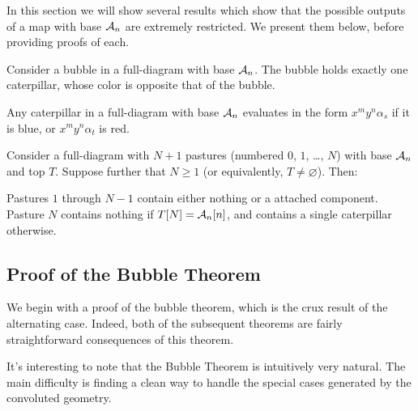 In this section we will show several results which show that the possible outputs of a map with base $\AA_n$ are extremely restricted.  We present them below, before providing proofs of each.
\begin{theorem}
	Consider a bubble in a full-diagram with base $\AA_n$.  The bubble holds exactly one caterpillar, whose color is opposite that of the bubble.
	\label{thm:bubble}
\end{theorem}
\begin{theorem}
	Any caterpillar in a full-diagram with base $\AA_n$ evaluates in the form $x^my^n\alpha_s$ if it is blue, or $x^my^n\alpha_t$ is red.
	\label{thm:caterpillar}
\end{theorem}
\begin{theorem}
	Consider a full-diagram with $N+1$ pastures (numbered $0$, $1$, \dots, $N$) with base $\AA_n$ and top $T$.  Suppose further that $N \ge 1$ (or equivalently, $T \neq \varnothing$).  Then:
	\begin{enumerate}[(i)]
		\ii Pastures $1$ through $N-1$ contain either nothing or a attached component.
		\ii Pasture $N$ contains nothing if $T[N] = \AA_n[n]$, and contains a single caterpillar otherwise.
	\end{enumerate}
	\label{thm:pasture}
\end{theorem}

\subsection{Proof of the Bubble Theorem}
We begin with a proof of the bubble theorem, which is the crux result of the alternating case.  Indeed, both of the subsequent theorems are fairly straightforward consequences of this theorem.

It's interesting to note that the Bubble Theorem is intuitively very natural.  The main difficulty is finding a clean way to handle the special cases generated by the convoluted geometry.

